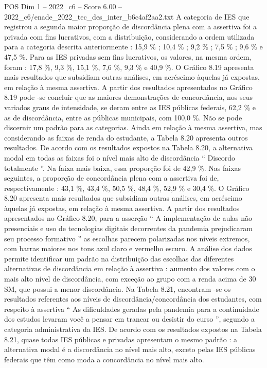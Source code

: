 \begin{textsample}{POS Dim 1 – 2022\_c6 – Score 6.00 – 2022\_c6/enade\_2022\_tec\_des\_inter\_b6c4af2aa2.txt}
A categoria de IES que registrou a segunda maior proporção de discordância plena com a assertiva foi a privada com fins lucrativos, com a distribuição, considerando a ordem utilizada para a categoria descrita anteriormente : 15,9 \% ; 10,4 \% ; 9,2 \% ; 7,5 \% ; 9,6 \% e 47,5 \%.
Para as IES privadas sem fins lucrativos, os valores, na mesma ordem, foram : 17,8 \%, 9,3 \%, 15,1 \%, 7,6 \%, 9,3 \% e 40,9 \%.
O Gráfico 8.19 apresenta mais resultados que subsidiam outras análises, em acréscimo àquelas já expostas, em relação à mesma assertiva.
A partir dos resultados apresentados no Gráfico 8.19 pode -se concluir que as maiores demonstrações de concordância, nos seus variados graus de intensidade, se deram entre as IES públicas federais, 62,2 \% e as de discordância, entre as públicas municipais, com 100,0 \%.
Não se pode discernir um padrão para as categorias.
Ainda em relação à mesma assertiva, mas considerando as faixas de renda do estudante, a Tabela 8.20 apresenta outros resultados.
De acordo com os resultados expostos na Tabela 8.20, a alternativa modal em todas as faixas foi o nível mais alto de discordância “ Discordo totalmente ”.
Na faixa mais baixa, essa proporção foi de 42,9 \%.
Nas faixas seguintes, a proporção de concordância plena com a assertiva foi de, respectivamente : 43,1 \%, 43,4 \%, 50,5 \%, 48,4 \%, 52,9 \% e 30,4 \%.
O Gráfico 8.20 apresenta mais resultados que subsidiam outras análises, em acréscimo àquelas já expostas, em relação à mesma assertiva.
A partir dos resultados apresentados no Gráfico 8.20, para a asserção “ A implementação de aulas não presenciais e uso de tecnologias digitais decorrentes da pandemia prejudicaram seu processo formativo ” as escolhas parecem polarizadas nos níveis extremos, com barras maiores nos tons azul claro e vermelho escuro.
A análise dos dados permite identificar um padrão na distribuição das escolhas das diferentes alternativas de discordância em relação à assertiva : aumento dos valores com o mais alto nível de discordância, com exceção ao grupo com a renda acima de 30 SM, que possui a menor discordância.
Na Tabela 8.21, encontram -se os resultados referentes aos níveis de discordância/concordância dos estudantes, com respeito à assertiva “ As dificuldades geradas pela pandemia para a continuidade dos estudos levaram você a pensar em trancar ou desistir do curso ”, segundo a categoria administrativa da IES.
De acordo com os resultados expostos na Tabela 8.21, quase todas IES públicas e privadas apresentam o mesmo padrão : a alternativa modal é a discordância no nível mais alto, exceto pelas IES públicas federais que têm como moda a concordância no nível mais alto.

\end{textsample}
